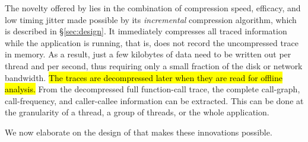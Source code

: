 The novelty offered by \parlot lies in the combination of compression
speed, efficacy, and low timing jitter
made possible by its {\em incremental}
compression algorithm, which is
described in \S\ref{sec:design}.
%
It immediately compresses all traced information while the application is running, that is, \parlot does not record the uncompressed trace in memory. 
%
As a result, just a few kilobytes of data need to be written out per thread and per second, thus requiring only a small fraction of the  disk or network bandwidth. 
%
\hl{The traces are decompressed later when they are read for offline analysis.} 
%
From the decompressed full function-call trace, the complete call-graph, 
call-frequency, and caller-callee information can be extracted. 
%
This can be done at the granularity of a thread, a group of threads, or the whole application.

%
We now elaborate on the design of \parlot that makes
these innovations possible.







